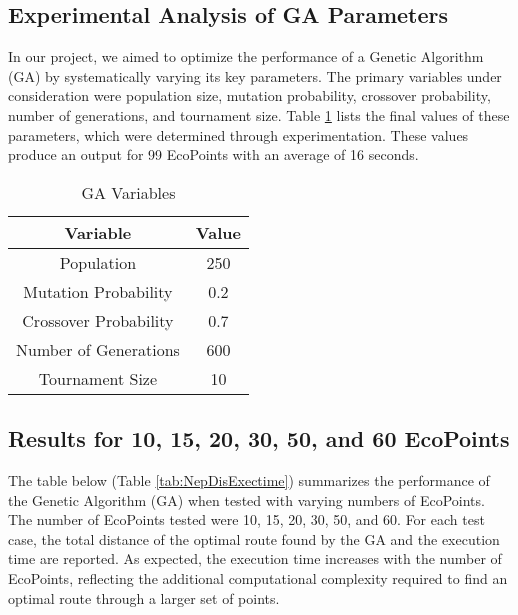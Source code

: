 
\subsection{Experimental Analysis of GA Parameters}

In our project, we aimed to optimize the performance of a Genetic Algorithm (GA) by systematically varying its key parameters.
The primary variables under consideration were population size, mutation probability, crossover probability, number of generations, and tournament size.
Table \ref{tab:GA_VARS} lists the final values of these parameters, which were determined through experimentation.
These values produce an output for 99 EcoPoints with an average of 16 seconds.


\begin{table}[H]
\begin{center}
    \begin{tabular}{|c|c|}
        \hline
        \textbf{Variable} & \textbf{Value} \\ \hline
        Population & 250 \\ \hline
        Mutation Probability & 0.2 \\ \hline
        Crossover Probability & 0.7 \\ \hline
        Number of Generations & 600 \\ \hline
        Tournament Size & 10 \\ \hline
    \end{tabular}
    \caption{GA Variables}
    \label{tab:GA_VARS}
\end{center}
\end{table}

\subsection{Results for 10, 15, 20, 30, 50, and 60 EcoPoints}

The table below (Table \ref{tab:NepDisExectime}) summarizes the performance of the Genetic Algorithm (GA) when tested with varying numbers of EcoPoints.
The number of EcoPoints tested were 10, 15, 20, 30, 50, and 60.
For each test case, the total distance of the optimal route found by the GA and the execution time are reported.
As expected, the execution time increases with the number of EcoPoints, reflecting the additional computational complexity required to find an optimal route through a larger set of points.

